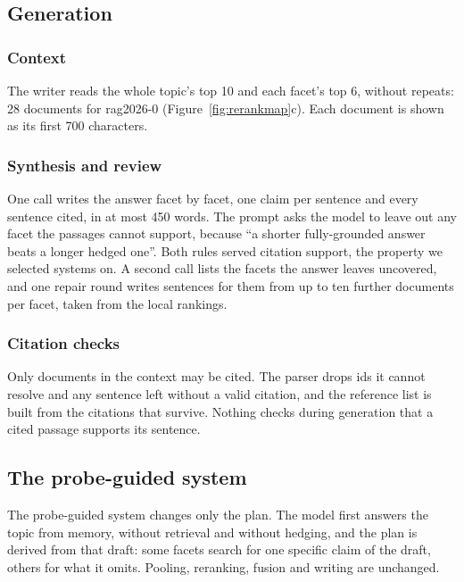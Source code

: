 \documentclass[sigconf,nonacm]{acmart}
\begin{document}
\subsection{Generation}

\subsubsection{Context}
The writer reads the whole topic's top 10 and each facet's top 6, without repeats:
28 documents for rag2026-0 (Figure~\ref{fig:rerankmap}c). Each document is shown as
its first 700 characters.

\subsubsection{Synthesis and review}
One call writes the answer facet by facet, one claim per sentence and every sentence
cited, in at most 450 words. The prompt asks the model to leave out any facet the
passages cannot support, because ``a shorter fully-grounded answer beats a longer
hedged one''. Both rules served citation support, the property we selected systems
on. A second call lists the facets the answer leaves uncovered, and one repair round
writes sentences for them from up to ten further documents per facet, taken from the
local rankings.

\subsubsection{Citation checks}
Only documents in the context may be cited. The parser drops ids it cannot resolve
and any sentence left without a valid citation, and the reference list is built from
the citations that survive. Nothing checks during generation that a cited passage
supports its sentence.

\subsection{The probe-guided system}
The probe-guided system changes only the plan. The model first answers the topic
from memory, without retrieval and without hedging, and the plan is derived from
that draft: some facets search for one specific claim of the draft, others for what
it omits. Pooling, reranking, fusion and writing are unchanged.
\end{document}
